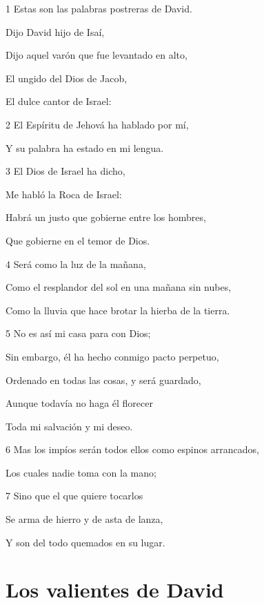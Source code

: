 \par 1 Estas son las palabras postreras de David. 
\par Dijo David hijo de Isaí,
\par Dijo aquel varón que fue levantado en alto,
\par El ungido del Dios de Jacob,
\par El dulce cantor de Israel:
\par 2 El Espíritu de Jehová ha hablado por mí,
\par Y su palabra ha estado en mi lengua.
\par 3 El Dios de Israel ha dicho,
\par Me habló la Roca de Israel:
\par Habrá un justo que gobierne entre los hombres,
\par Que gobierne en el temor de Dios.
\par 4 Será como la luz de la mañana,
\par Como el resplandor del sol en una mañana sin nubes,
\par Como la lluvia que hace brotar la hierba de la tierra.
\par 5 No es así mi casa para con Dios;
\par Sin embargo, él ha hecho conmigo pacto perpetuo,
\par Ordenado en todas las cosas, y será guardado,
\par Aunque todavía no haga él florecer
\par Toda mi salvación y mi deseo.
\par 6 Mas los impíos serán todos ellos como espinos arrancados,
\par Los cuales nadie toma con la mano;
\par 7 Sino que el que quiere tocarlos
\par Se arma de hierro y de asta de lanza,
\par Y son del todo quemados en su lugar.

\section*{Los valientes de David}


